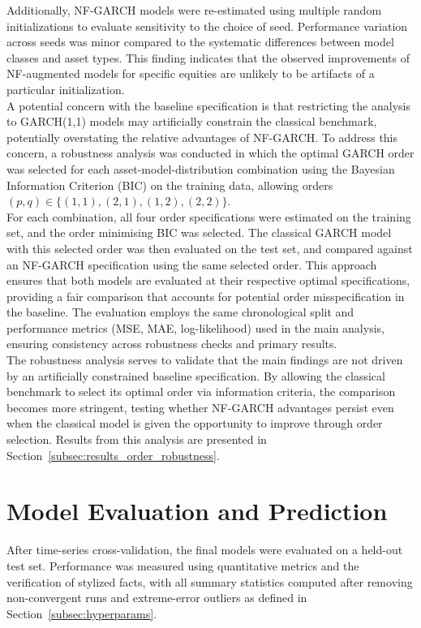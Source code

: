 \documentclass[oneside,12pt]{CUEDthesisPSnPDF}
\begin{document}
Additionally, NF-GARCH models were re-estimated using multiple random initializations to evaluate sensitivity to the choice of seed. Performance variation across seeds was minor compared to the systematic differences between model classes and asset types. This finding indicates that the observed improvements of NF-augmented models for specific equities are unlikely to be artifacts of a particular initialization.\\

A potential concern with the baseline specification is that restricting the analysis to GARCH(1,1) models may artificially constrain the classical benchmark, potentially overstating the relative advantages of NF-GARCH. To address this concern, a robustness analysis was conducted in which the optimal GARCH order was selected for each asset-model-distribution combination using the Bayesian Information Criterion (BIC) on the training data, allowing orders $(p,q) \in \{(1,1), (2,1), (1,2), (2,2)\}$.\\

For each combination, all four order specifications were estimated on the training set, and the order minimising BIC was selected. The classical GARCH model with this selected order was then evaluated on the test set, and compared against an NF-GARCH specification using the same selected order. This approach ensures that both models are evaluated at their respective optimal specifications, providing a fair comparison that accounts for potential order misspecification in the baseline. The evaluation employs the same chronological split and performance metrics (MSE, MAE, log-likelihood) used in the main analysis, ensuring consistency across robustness checks and primary results.\\

The robustness analysis serves to validate that the main findings are not driven by an artificially constrained baseline specification. By allowing the classical benchmark to select its optimal order via information criteria, the comparison becomes more stringent, testing whether NF-GARCH advantages persist even when the classical model is given the opportunity to improve through order selection. Results from this analysis are presented in Section~\ref{subsec:results_order_robustness}.\\


\section{Model Evaluation and Prediction} 
\noindent 
After time-series cross-validation, the final models were evaluated on a held-out test set. Performance was measured using quantitative metrics and the verification of stylized facts, with all summary statistics computed after removing non-convergent runs and extreme-error outliers as defined in Section~\ref{subsec:hyperparams}.\\
\end{document}

